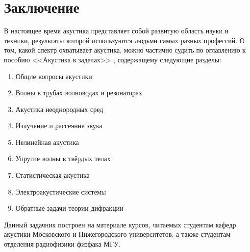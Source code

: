 \section*{Заключение}
В настоящее время акустика представляет собой развитую область науки и техники, результаты которой используются людьми самых разных профессий. О том, какой спектр охватывает акустика, можно частично судить по оглавлению к  пособию <<Акустика в задачах>> \cite{nu4}, содержащему следующие разделы:
\begin{enumerate}
	\setlength\itemsep{-0.4em}
    \item  Общие вопросы акустики
    \item  Волны в трубах волноводах и резонаторах
    \item  Акустика неоднородных сред
    \item  Излучение и рассеяние звука
    \item  Нелинейная акустика
    \item  Упругие волны в твёрдых телах
    \item  Статистическая акустика
    \item  Электроакустические системы
    \item  Обратные задачи теории дифракции
\end{enumerate}

Данный задачник построен на материале курсов, читаемых студентам кафедр акустики Московского и Нижегородского университетов,  а также студентам отделения радиофизики физфака МГУ.